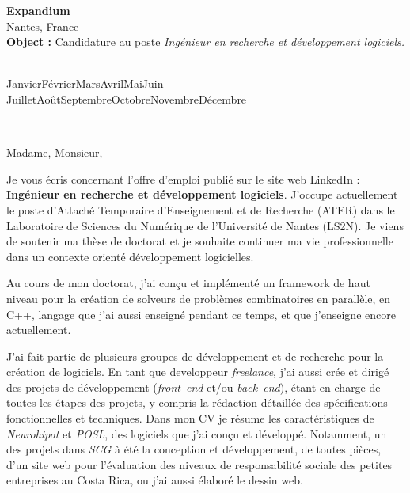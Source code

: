 \documentclass[11pt,a4paper]{letter} %
\def\today{\number\day\space\ifcase\month\or
  Janvier\or Février\or Mars\or Avril\or Mai\or Juin\or
  Juillet\or Août\or Septembre\or Octobre\or Novembre\or Décembre\fi
  \space\number\year}
\def\opening#1{\thispagestyle{empty}
{\centering\fromaddress \vspace{0.6in} \\ %
\hspace{6cm}\today\hspace*{\fill}\par} %
{\raggedright \toname \\ \toaddress \par} %
\vspace{0.4in} %
\noindent #1 %
}
\begin{document}

\begin{letter}
{{\bf Expandium}\\Nantes, France\\
\vspace{0.2in}
\textbf{Object :} Candidature au poste \textit{Ingénieur en recherche et développement logiciels.}
}


\opening{Madame, Monsieur,}

Je vous écris concernant l'offre d'emploi publié sur le site web LinkedIn : 
\textbf{Ingénieur en recherche et développement logiciels}. 
J'occupe actuellement le poste d'Attaché Temporaire d'Enseignement et de Recherche (ATER) dans le Laboratoire de Sciences du Numérique de l'Université de Nantes (LS2N). Je viens de soutenir ma thèse de doctorat et je souhaite continuer ma vie professionnelle dans un contexte orienté développement logicielles.

Au cours de mon doctorat, j'ai con\c cu et implémenté un framework de haut niveau pour la création de solveurs de problèmes combinatoires en parallèle, en C++, langage que j'ai aussi enseigné pendant ce temps, et que j'enseigne encore actuellement. 

J'ai fait partie de plusieurs groupes de développement et de recherche pour la création de logiciels. En tant que developpeur \textit{freelance}, j'ai aussi crée et dirigé des projets de développement (\textit{front--end} et/ou \textit{back--end}), étant en charge de toutes les étapes des projets, y compris la rédaction détaillée des spécifications fonctionnelles et techniques. Dans mon CV je résume les caractéristiques de \textit{Neurohipot} et \textit{POSL}, des logiciels que j'ai conçu et développé. Notamment, un des projets dans \textit{SCG} à été la conception et développement, de toutes pièces, d'un site web pour l'évaluation des niveaux de responsabilité sociale des petites entreprises au Costa Rica, ou j'ai aussi élaboré le dessin web.


\end{letter}
\end{document}
